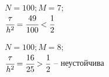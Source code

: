 \documentclass[12pt]{extarticle}
\numberwithin{equation}{section}
\begin{document}
\begin{figure}[H]
\begin{minipage}[h]{0.43\linewidth}
 $N=100; M=7;$\\$\cfrac{\tau}{h^2} = \cfrac{49}{100} < \cfrac{1}{2}$ \\
\end{minipage}
\hfill
\begin{minipage}[h]{0.43\linewidth}
 $N=100; M=8;$\\$ \cfrac{\tau}{h^2} = \cfrac{16}{25} > \cfrac{1}{2}$ -- неустойчива
\end{minipage}
\end{figure}
\end{document}
